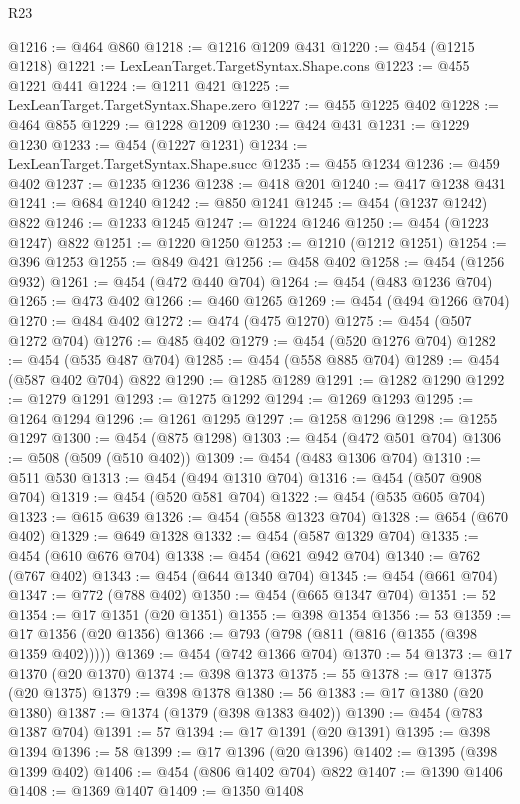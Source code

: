 \begin{lexlean}{R23}
\begin{coremodule}
@1216 := @464 @860
@1218 := @1216 @1209 @431
@1220 := @454 (@1215 @1218)
@1221 := LexLeanTarget.TargetSyntax.Shape.cons
@1223 := @455 @1221 @441
@1224 := @1211 @421
@1225 := LexLeanTarget.TargetSyntax.Shape.zero
@1227 := @455 @1225 @402
@1228 := @464 @855
@1229 := @1228 @1209
@1230 := @424 @431
@1231 := @1229 @1230
@1233 := @454 (@1227 @1231)
@1234 := LexLeanTarget.TargetSyntax.Shape.succ
@1235 := @455 @1234
@1236 := @459 @402
@1237 := @1235 @1236
@1238 := @418 @201
@1240 := @417 @1238 @431
@1241 := @684 @1240
@1242 := @850 @1241
@1245 := @454 (@1237 @1242) @822
@1246 := @1233 @1245
@1247 := @1224 @1246
@1250 := @454 (@1223 @1247) @822
@1251 := @1220 @1250
@1253 := @1210 (@1212 @1251)
@1254 := @396 @1253
@1255 := @849 @421
@1256 := @458 @402
@1258 := @454 (@1256 @932)
@1261 := @454 (@472 @440 @704)
@1264 := @454 (@483 @1236 @704)
@1265 := @473 @402
@1266 := @460 @1265
@1269 := @454 (@494 @1266 @704)
@1270 := @484 @402
@1272 := @474 (@475 @1270)
@1275 := @454 (@507 @1272 @704)
@1276 := @485 @402
@1279 := @454 (@520 @1276 @704)
@1282 := @454 (@535 @487 @704)
@1285 := @454 (@558 @885 @704)
@1289 := @454 (@587 @402 @704) @822
@1290 := @1285 @1289
@1291 := @1282 @1290
@1292 := @1279 @1291
@1293 := @1275 @1292
@1294 := @1269 @1293
@1295 := @1264 @1294
@1296 := @1261 @1295
@1297 := @1258 @1296
@1298 := @1255 @1297
@1300 := @454 (@875 @1298)
@1303 := @454 (@472 @501 @704)
@1306 := @508 (@509 (@510 @402))
@1309 := @454 (@483 @1306 @704)
@1310 := @511 @530
@1313 := @454 (@494 @1310 @704)
@1316 := @454 (@507 @908 @704)
@1319 := @454 (@520 @581 @704)
@1322 := @454 (@535 @605 @704)
@1323 := @615 @639
@1326 := @454 (@558 @1323 @704)
@1328 := @654 (@670 @402)
@1329 := @649 @1328
@1332 := @454 (@587 @1329 @704)
@1335 := @454 (@610 @676 @704)
@1338 := @454 (@621 @942 @704)
@1340 := @762 (@767 @402)
@1343 := @454 (@644 @1340 @704)
@1345 := @454 (@661 @704)
@1347 := @772 (@788 @402)
@1350 := @454 (@665 @1347 @704)
@1351 := 52
@1354 := @17 @1351 (@20 @1351)
@1355 := @398 @1354
@1356 := 53
@1359 := @17 @1356 (@20 @1356)
@1366 := @793 (@798 (@811 (@816 (@1355 (@398 @1359 @402)))))
@1369 := @454 (@742 @1366 @704)
@1370 := 54
@1373 := @17 @1370 (@20 @1370)
@1374 := @398 @1373
@1375 := 55
@1378 := @17 @1375 (@20 @1375)
@1379 := @398 @1378
@1380 := 56
@1383 := @17 @1380 (@20 @1380)
@1387 := @1374 (@1379 (@398 @1383 @402))
@1390 := @454 (@783 @1387 @704)
@1391 := 57
@1394 := @17 @1391 (@20 @1391)
@1395 := @398 @1394
@1396 := 58
@1399 := @17 @1396 (@20 @1396)
@1402 := @1395 (@398 @1399 @402)
@1406 := @454 (@806 @1402 @704) @822
@1407 := @1390 @1406
@1408 := @1369 @1407
@1409 := @1350 @1408

\end{coremodule}
\end{lexlean}

